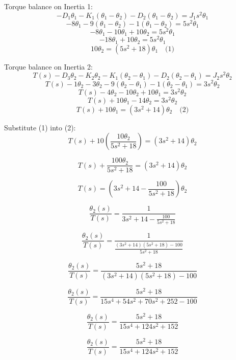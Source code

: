 Torque balance on Inertia 1:
\[
- D_1 \theta_1 - K_1 (\theta_1 - \theta_2) - D_2 (\theta_1 - \theta_2) = J_1 s^2 \theta_1
\]
\[
-8\theta_1 - 9(\theta_1 - \theta_2) - 1(\theta_1 - \theta_2) = 5s^2 \theta_1
\]
\[
-8\theta_1 - 10\theta_1 + 10\theta_2 = 5s^2 \theta_1
\]
\[
-18\theta_1 + 10\theta_2 = 5s^2 \theta_1
\]
\[
10\theta_2 = (5s^2 + 18)\theta_1 \quad \text{(1)}
\]

Torque balance on Inertia 2:
\[
T(s) - D_3 \theta_2 - K_2 \theta_2 - K_1 (\theta_2 - \theta_1) - D_2 (\theta_2 - \theta_1) = J_2 s^2 \theta_2
\]
\[
T(s) - 1\theta_2 - 3\theta_2 - 9(\theta_2 - \theta_1) - 1(\theta_2 - \theta_1) = 3s^2 \theta_2
\]
\[
T(s) - 4\theta_2 - 10\theta_2 + 10\theta_1 = 3s^2 \theta_2
\]
\[
T(s) + 10\theta_1 - 14\theta_2 = 3s^2 \theta_2
\]
\[
T(s) + 10\theta_1 = (3s^2 + 14)\theta_2 \quad \text{(2)}
\]

Substitute (1) into (2):
\[
T(s) + 10\left( \frac{10\theta_2}{5s^2 + 18} \right) = (3s^2 + 14)\theta_2
\]

\[
T(s) + \frac{100\theta_2}{5s^2 + 18} = (3s^2 + 14)\theta_2
\]

\[
T(s) = \left( 3s^2 + 14 - \frac{100}{5s^2 + 18} \right)\theta_2
\]

\[
\frac{\theta_2(s)}{T(s)} = \frac{1}{3s^2 + 14 - \frac{100}{5s^2 + 18}}
\]

\[
\frac{\theta_2(s)}{T(s)}= \frac{1}{\frac{(3s^2 + 14)(5s^2 + 18) - 100}{5s^2 + 18}}
\]

\[
\frac{\theta_2(s)}{T(s)}= \frac{5s^2 + 18}{(3s^2 + 14)(5s^2 + 18) - 100}
\]

\[
\frac{\theta_2(s)}{T(s)}= \frac{5s^2 + 18}{15s^4 + 54s^2 + 70s^2 + 252 - 100}
\]

\[
\frac{\theta_2(s)}{T(s)}= \frac{5s^2 + 18}{15s^4 + 124s^2 + 152}
\]

\[
\boxed{\frac{\theta_2(s)}{T(s)} = \frac{5s^2 + 18}{15s^4 + 124s^2 + 152}}
\]

\newpage

